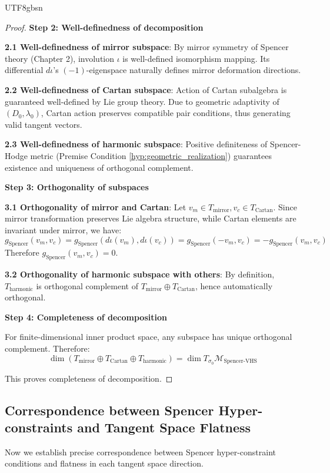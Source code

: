 \documentclass[a4paper,12pt]{extarticle}
\theoremstyle{definition}
\begin{document}
\begin{CJK}{UTF8}{gbsn}
\begin{proof}
\textbf{Step 2: Well-definedness of decomposition}

\textbf{2.1 Well-definedness of mirror subspace}:
By mirror symmetry of Spencer theory (Chapter 2), involution $\iota$ is well-defined isomorphism mapping. Its differential $d\iota$'s $(-1)$-eigenspace naturally defines mirror deformation directions.

\textbf{2.2 Well-definedness of Cartan subspace}:
Action of Cartan subalgebra is guaranteed well-defined by Lie group theory. Due to geometric adaptivity of $(D_0, \lambda_0)$, Cartan action preserves compatible pair conditions, thus generating valid tangent vectors.

\textbf{2.3 Well-definedness of harmonic subspace}:
Positive definiteness of Spencer-Hodge metric (Premise Condition \ref{hyp:geometric_realization}) guarantees existence and uniqueness of orthogonal complement.

\textbf{Step 3: Orthogonality of subspaces}

\textbf{3.1 Orthogonality of mirror and Cartan}:
Let $v_m \in T_{\text{mirror}}, v_c \in T_{\text{Cartan}}$. Since mirror transformation preserves Lie algebra structure, while Cartan elements are invariant under mirror, we have:
$$g_{\text{Spencer}}(v_m, v_c) = g_{\text{Spencer}}(d\iota(v_m), d\iota(v_c)) = g_{\text{Spencer}}(-v_m, v_c) = -g_{\text{Spencer}}(v_m, v_c)$$
Therefore $g_{\text{Spencer}}(v_m, v_c) = 0$.

\textbf{3.2 Orthogonality of harmonic subspace with others}:
By definition, $T_{\text{harmonic}}$ is orthogonal complement of $T_{\text{mirror}} \oplus T_{\text{Cartan}}$, hence automatically orthogonal.

\textbf{Step 4: Completeness of decomposition}

For finite-dimensional inner product space, any subspace has unique orthogonal complement. Therefore:
$$\dim(T_{\text{mirror}} \oplus T_{\text{Cartan}} \oplus T_{\text{harmonic}}) = \dim T_{\sigma_0} \mathcal{M}_{\text{Spencer-VHS}}$$

This proves completeness of decomposition.
\end{proof}

\subsection{Correspondence between Spencer Hyper-constraints and Tangent Space Flatness}

Now we establish precise correspondence between Spencer hyper-constraint conditions and flatness in each tangent space direction.


\end{CJK}
\end{document}
